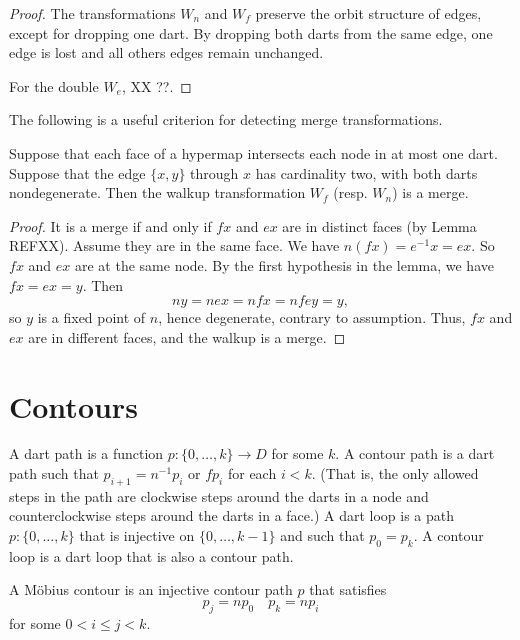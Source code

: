 \begin{proof} The transformations $W_n$ and $W_f$ preserve the orbit
structure of edges, except for dropping one dart.  By dropping both
darts from the same edge, one edge is lost and all others edges
remain unchanged.

For the double $W_e$, XX ??.
\end{proof}

The following is a useful criterion for detecting merge
transformations.

\begin{lemma}  Suppose that each face of a hypermap intersects each node in at
most one dart.  Suppose that the edge $\{x,y\}$ through $x$ has
cardinality two, with both darts nondegenerate.  Then the walkup
transformation $W_f$ (resp. $W_n$) is a merge.
\end{lemma}

\begin{proof} It is a merge if and only if $f x$ and $e x$ are in
distinct faces (by Lemma REFXX).  Assume they are in the same face.
We have $n (f x) = e^{-1} x = e x$. So $f x$ and $e x$ are at the
same node. By the first hypothesis in the lemma, we have $f x = e x
= y$. Then $$n y = n e x = n f x = n f e y = y,$$ so $y$ is a fixed
point of $n$, hence degenerate, contrary to assumption.  Thus, $f x$
and $e x$ are in different faces, and the walkup is a merge.
\end{proof}




\section{Contours}

\begin{definition}  A dart path is a function $p:\{0,\ldots,k\}\to D$
for some $k$.  A contour path is a dart path such that $p_{i+1} =
n^{-1} p_i$ or $f p_i$ for each $i<k$.  (That is, the only allowed
steps in the path are clockwise steps around the darts in a node and
counterclockwise steps around the darts in a face.)  A dart loop is
a path $p:\{0,\ldots,k\}$ that is injective on $\{0,\ldots,k-1\}$
and such that $p_0 = p_k$.  A contour loop is a dart loop that is
also a contour path.
\end{definition}

\begin{definition} A M\"obius contour is an
injective contour path $p$ that satisfies
    \begin{equation}
    \label{eqn:mobius}
    p_j = n p_0\quad p_k = n p_i
    \end{equation}
for some $0 < i\le j< k$.
\end{definition}

